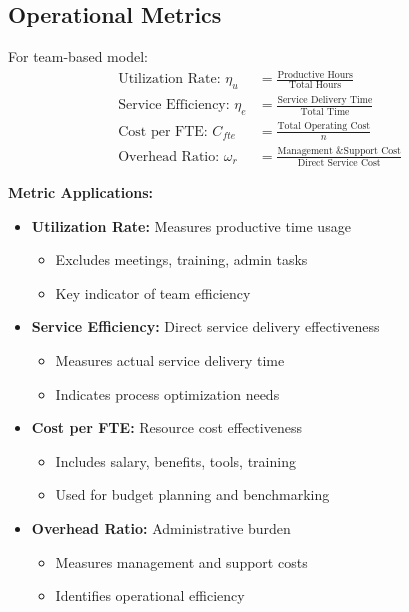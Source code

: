 \documentclass[12pt,a4paper]{article}
\newenvironment{definition}[1]
{\begin{mdframed}[style=definitionstyle,frametitle={Definition: #1}]}
{\end{mdframed}}
\newenvironment{explanation}
{\begin{mdframed}[style=explanationstyle,frametitle={Explanation}]}
{\end{mdframed}}
\begin{document}
\subsection{Operational Metrics}
\begin{definition}{Team Efficiency Metrics}
For team-based model:
\begin{align*}
    \text{Utilization Rate: } \eta_u &= \frac{\text{Productive Hours}}{\text{Total Hours}} \\[1em]
    \text{Service Efficiency: } \eta_e &= \frac{\text{Service Delivery Time}}{\text{Total Time}} \\[1em]
    \text{Cost per FTE: } C_{fte} &= \frac{\text{Total Operating Cost}}{n} \\[1em]
    \text{Overhead Ratio: } \omega_r &= \frac{\text{Management \& Support Cost}}{\text{Direct Service Cost}}
\end{align*}
\end{definition}

\begin{explanation}
\textbf{Metric Applications:}
\begin{itemize}
    \item \textbf{Utilization Rate:} Measures productive time usage
        \begin{itemize}
            \item Excludes meetings, training, admin tasks
            \item Key indicator of team efficiency
        \end{itemize}
    \item \textbf{Service Efficiency:} Direct service delivery effectiveness
        \begin{itemize}
            \item Measures actual service delivery time
            \item Indicates process optimization needs
        \end{itemize}
    \item \textbf{Cost per FTE:} Resource cost effectiveness
        \begin{itemize}
            \item Includes salary, benefits, tools, training
            \item Used for budget planning and benchmarking
        \end{itemize}
    \item \textbf{Overhead Ratio:} Administrative burden
        \begin{itemize}
            \item Measures management and support costs
            \item Identifies operational efficiency
        \end{itemize}
\end{itemize}
\end{explanation}
\end{document}

